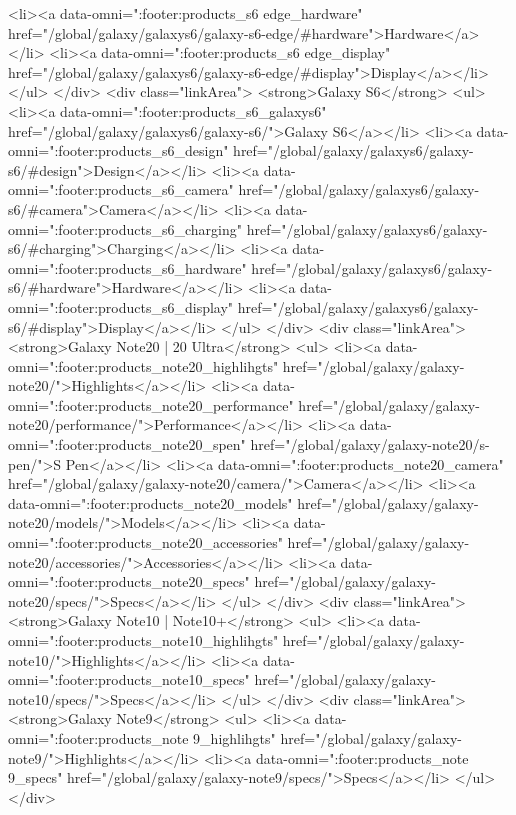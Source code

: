 {{{{{{{{{{{{{{{{{{{{{{{{{{{{{{{{{{{{{{{{{{{{{{{{{{{{{				<li><a data-omni=":footer:products_s6 edge_hardware" href="/global/galaxy/galaxys6/galaxy-s6-edge/#hardware">Hardware</a></li>
				<li><a data-omni=":footer:products_s6 edge_display" href="/global/galaxy/galaxys6/galaxy-s6-edge/#display">Display</a></li>
			</ul>
		</div>
		<div class="linkArea">
			<strong>Galaxy S6</strong>
			<ul>
				<li><a data-omni=":footer:products_s6_galaxys6" href="/global/galaxy/galaxys6/galaxy-s6/">Galaxy S6</a></li>
				<li><a data-omni=":footer:products_s6_design" href="/global/galaxy/galaxys6/galaxy-s6/#design">Design</a></li>
				<li><a data-omni=":footer:products_s6_camera" href="/global/galaxy/galaxys6/galaxy-s6/#camera">Camera</a></li>
				<li><a data-omni=":footer:products_s6_charging" href="/global/galaxy/galaxys6/galaxy-s6/#charging">Charging</a></li>
				<li><a data-omni=":footer:products_s6_hardware" href="/global/galaxy/galaxys6/galaxy-s6/#hardware">Hardware</a></li>
				<li><a data-omni=":footer:products_s6_display" href="/global/galaxy/galaxys6/galaxy-s6/#display">Display</a></li>
			</ul>
		</div>
		<div class="linkArea">
			<strong>Galaxy Note20 | 20 Ultra</strong>
			<ul>
				<li><a data-omni=":footer:products_note20_highlihgts" href="/global/galaxy/galaxy-note20/">Highlights</a></li>
				<li><a data-omni=":footer:products_note20_performance" href="/global/galaxy/galaxy-note20/performance/">Performance</a></li>
				<li><a data-omni=":footer:products_note20_spen" href="/global/galaxy/galaxy-note20/s-pen/">S Pen</a></li>
				<li><a data-omni=":footer:products_note20_camera" href="/global/galaxy/galaxy-note20/camera/">Camera</a></li>
				<li><a data-omni=":footer:products_note20_models" href="/global/galaxy/galaxy-note20/models/">Models</a></li>
				<li><a data-omni=":footer:products_note20_accessories" href="/global/galaxy/galaxy-note20/accessories/">Accessories</a></li>
				<li><a data-omni=":footer:products_note20_specs" href="/global/galaxy/galaxy-note20/specs/">Specs</a></li>
			</ul>
		</div>
		<div class="linkArea">
			<strong>Galaxy Note10 | Note10+</strong>
			<ul>
				<li><a data-omni=":footer:products_note10_highlihgts" href="/global/galaxy/galaxy-note10/">Highlights</a></li>
				<li><a data-omni=":footer:products_note10_specs" href="/global/galaxy/galaxy-note10/specs/">Specs</a></li>
			</ul>
		</div>
		<div class="linkArea">
			<strong>Galaxy Note9</strong>
			<ul>
				<li><a data-omni=":footer:products_note 9_highlihgts" href="/global/galaxy/galaxy-note9/">Highlights</a></li>
				<li><a data-omni=":footer:products_note 9_specs" href="/global/galaxy/galaxy-note9/specs/">Specs</a></li>
			</ul>
		</div>
}}}}}}}}}}}}}}}}}}}}}}}}}}}}}}}}}}}}}}}}}}}}}}}}}}}}}
